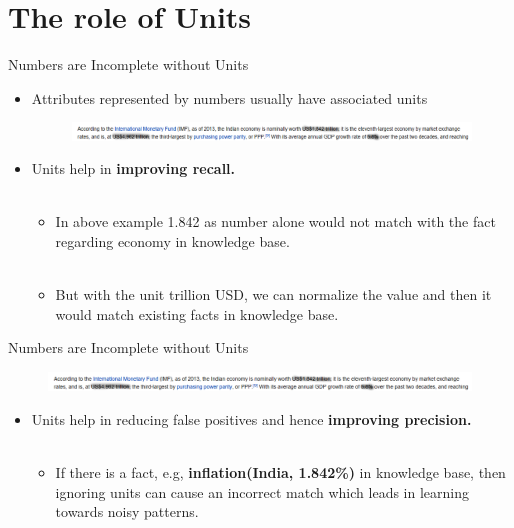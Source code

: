\documentclass{beamer}
\begin{document}
\section{The role of Units}
\begin{frame}{Numbers are Incomplete without Units} \pause
 
 \begin{itemize}
  
  \item  Attributes represented by numbers usually have associated units \pause
  \begin{figure}[h]
 \centering
 \includegraphics[bb=0 0 1139 53,scale=0.27]{./images/ex_6.png}
\end{figure}

  \pause 
  \item Units help in \textbf{improving recall.}  \pause \\~\\ 
  
  \begin{itemize}
      \item In above example 1.842 as number alone would not match with the fact regarding economy in knowledge base. \pause \\~\\
      \item But with the unit trillion USD, we can normalize the value and then it would match existing facts in knowledge base. 
      
  \end{itemize}
  \end{itemize}
  \end{frame}

\begin{frame}{Numbers are Incomplete without Units} 
    \begin{figure}
    \centering
    \includegraphics[width = 1.0\textwidth]{images/ex_6}
  \end{figure}
  
  \begin{itemize}
  \item Units help in reducing false positives and hence \textbf{improving precision.} \pause \\~\\
  \begin{itemize}
      \item If there is a fact, e.g, \textbf{inflation(India, 1.842\%)} in knowledge base, then ignoring units can cause an incorrect match which leads in learning towards noisy patterns. \\~\\
  \end{itemize}
  
 \end{itemize}

 
\end{frame}
\end{document}
